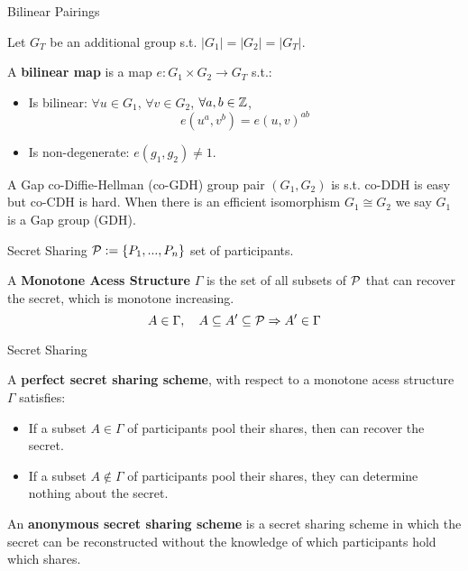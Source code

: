 \begin{frame}{Bilinear Pairings}
\begin{defn}
Let $G_T$ be an additional group s.t. $ |G_1| = |G_2| = |G_T| $. 

A \textbf{bilinear map} is a map $e: G_1 \times G_2 \rightarrow G_T$ s.t.:
\begin{itemize}
\item Is bilinear: $\forall u \in G_1$, $\forall v \in G_2$, $ \forall a,b \in {\mathbb Z}$, $$e(u^a, v^b) = e(u,v)^{ab} $$
\item Is non-degenerate: $e(g_1, g_2) \neq 1$.
\end{itemize}
\end{defn}
\begin{defn}
A Gap co-Diffie-Hellman (co-GDH) group pair $(G_1,G_2)$ is s.t. co-DDH is easy but co-CDH is hard. When there is an efficient isomorphism $G_1 \cong G_2$ we say $G_1$ is a Gap group (GDH).

\end{defn}
\end{frame}


\begin{frame}{Secret Sharing}
${\mathcal P} := \{ P_1, ..., P_n\}$ set of participants.
\begin{defn}
A \textbf{Monotone Acess Structure} $\Gamma$ is the set of all subsets of ${\mathcal P}$ that can recover the secret, which is monotone increasing. $$ A \in \Gamma, \quad A \subseteq A' \subseteq {\mathcal P} \Rightarrow A' \in \Gamma$$
\end{defn}
\end{frame}

\begin{frame}{Secret Sharing}
\begin{defn}
A \textbf{perfect secret sharing scheme}, with respect to a monotone acess structure $\Gamma$ satisfies:
\begin{itemize}
\item If a subset $A \in \Gamma$ of participants pool their shares, then can recover the secret.
\item If a subset $A \notin \Gamma$ of participants pool their shares, they can determine nothing about the secret.
\end{itemize}
\end{defn}
\begin{defn}
An \textbf{anonymous secret sharing scheme} is a secret sharing scheme in which the secret can be reconstructed without the knowledge of which participants hold which shares.
\end{defn}
\end{frame}

